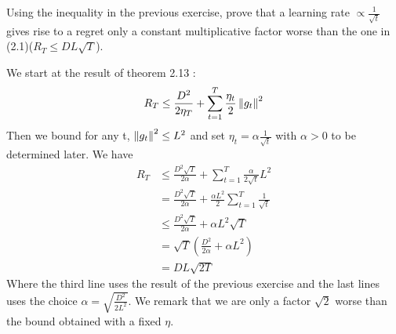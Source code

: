 \begin{exercise}[]{}
	Using the inequality in the previous exercise, prove that a learning rate $ \propto \frac{1}{\sqrt{t}} $ gives rise to a regret only a constant multiplicative factor worse than the one in (2.1)($ R_T \leq DL \sqrt{T} $).
\end{exercise}

\begin{solution}[]
	We start at the result of theorem 2.13 :
\begin{equation*}
	R_T \leq \frac{D^2}{2\eta_T} + \sum_{t=1}^{T}\frac{\eta_t}{2}\left\|g_t\right\|^2
\end{equation*}
Then we bound for any t, $ \left\|g_t\right\|^2 \leq L^2 $ and set $ \eta_t = \alpha \frac{1}{\sqrt{t}} $ with $ \alpha >0 $ to be determined later. We have 
\begin{align*}
	R_T &\leq \frac{D^2 \sqrt{T}}{2\alpha} + \sum_{t=1}^{T}\frac{\alpha}{2\sqrt{t}} L^2  \\
	    &= \frac{D^2 \sqrt{T}}{2\alpha} + \frac{\alpha L^2}{2}\sum_{t=1}^{T}\frac{1}{\sqrt{t}} \\
	    &\leq \frac{D^2 \sqrt{T}}{2\alpha} + \alpha L^2 \sqrt{T} \\
	    &=\sqrt{T}\left( \frac{D^2}{2\alpha} + \alpha L^2 \right) \\
	    &=DL \sqrt{2T}
\end{align*}
Where the third line uses the result of the previous exercise and the last lines uses the choice $ \alpha = \sqrt{\frac{D^2}{2L^2}} $. We remark that we are only a factor $ \sqrt{2} $ worse than the bound obtained with a fixed $ \eta $.


\end{solution}
